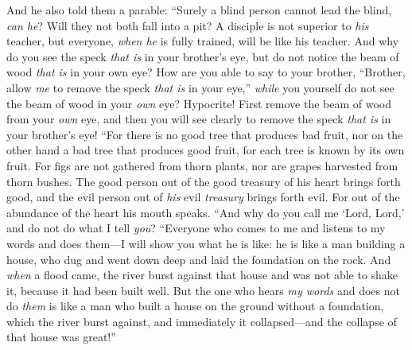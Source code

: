\begin{biblechapter}
\verse And he also told them a parable: “Surely a blind person cannot lead the blind, \textit{can he}? Will they not both fall into a pit?
\verse A disciple is not superior to \textit{his} teacher, but everyone, \textit{when he} is fully trained, will be like his teacher.
\verse And why do you see the speck \textit{that is} in your brother’s eye, but do not notice the beam of wood \textit{that is} in your own eye?
\verse How are you able to say to your brother, “Brother, allow \textit{me} to remove the speck \textit{that is} in your eye,” \textit{while} you yourself do not see the beam of wood in your \textit{own} eye? Hypocrite! First remove the beam of wood from your \textit{own} eye, and then you will see clearly to remove the speck \textit{that is} in your brother’s eye!
 “For there is no good tree that produces bad fruit, nor on the other hand a bad tree that produces good fruit,
\verse for each tree is known by its own fruit. For figs are not gathered from thorn plants, nor are grapes harvested from thorn bushes.
\verse The good person out of the good treasury of his heart brings forth good, and the evil person out of \textit{his} evil \textit{treasury} brings forth evil. For out of the abundance of the heart his mouth speaks.
\verse “And why do you call me ‘Lord, Lord,’ and do not do what I tell \textit{you}?
 “Everyone who comes to me and listens to my words and does them—I will show you what he is like:
\verse he is like a man building a house, who dug and went down deep and laid the foundation on the rock. And \textit{when} a flood came, the river burst against that house and was not able to shake it, because it had been built well.
\verse But the one who hears \textit{my words} and does not do \textit{them} is like a man who built a house on the ground without a foundation, which the river burst against, and immediately it collapsed—and the collapse of that house was great!”
\end{biblechapter}

